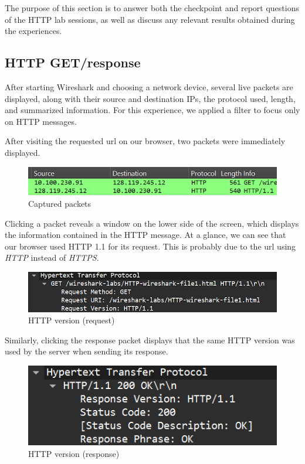 The purpose of this section is to answer both the checkpoint and report
questions of the HTTP lab sessions, as well as discuss any relevant results
obtained during the experiences.

\subsection{HTTP GET/response}
After starting Wireshark and choosing a network device, several live packets
are displayed, along with their source and destination IPs, the protocol used,
length, and summarized information. For this experience, we applied a filter to
focus only on HTTP messages.

After visiting the requested url on our browser, two packets were immediately
displayed.

\begin{figure}[htbp]
    \centering
    \includegraphics[width=1\linewidth]{img/1.png}
    \caption{Captured packets}\label{fig:1}
\end{figure}

Clicking a packet reveals a window on the lower side of the screen, which
displays the information contained in the HTTP message. At a glance, we can see
that our browser used HTTP 1.1 for its request. This is probably due to the url
using \textit{HTTP} instead of \textit{HTTPS}.

\begin{figure}[htbp]
    \centering
    \includegraphics[width=1\linewidth]{img/2.png}
    \caption{HTTP version (request)}\label{fig:2}
\end{figure}

Similarly, clicking the response packet displays that the same HTTP version was
used by the server when sending its response.

\begin{figure}[htbp]
    \centering
    \includegraphics[width=1\linewidth]{img/3.png}
    \caption{HTTP version (response)}\label{fig:3}
\end{figure}

